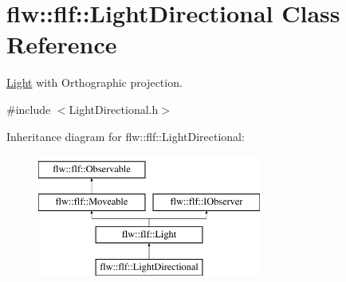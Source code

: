 \hypertarget{classflw_1_1flf_1_1LightDirectional}{}\section{flw\+:\+:flf\+:\+:Light\+Directional Class Reference}
\label{classflw_1_1flf_1_1LightDirectional}


\hyperlink{classflw_1_1flf_1_1Light}{Light} with Orthographic projection.  




{\ttfamily \#include $<$Light\+Directional.\+h$>$}

Inheritance diagram for flw\+:\+:flf\+:\+:Light\+Directional\+:\begin{figure}[H]
\begin{center}
\leavevmode
\includegraphics[height=4.000000cm]{classflw_1_1flf_1_1LightDirectional}
\end{center}
\end{figure}
